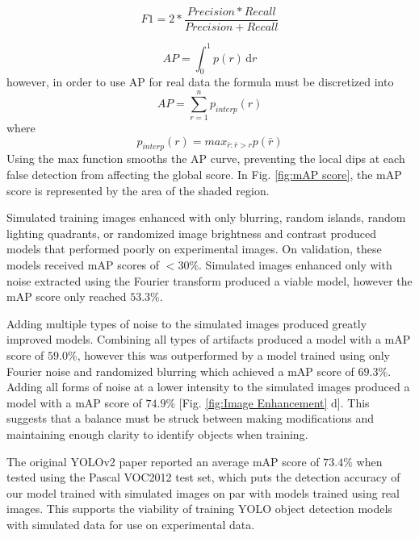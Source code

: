 \documentclass[twoside,twocolumn,9pt]{article}
\begin{document}
\begin{equation}
F1 = 2*\frac{Precision * Recall}{Precision + Recall}
\end{equation}


$$ AP = \int_0^1 \!p(r) \, \mathrm{d}r $$
however, in order to use AP for real data the formula must be discretized into
\begin{equation}
AP = \sum_{r=1}^{n} p_{interp}(r)
\end{equation}
where
$$ p_{interp}(r) = max_{\bar{r}:\bar{r}>r} p(\bar{r})  $$
Using the max function smooths the AP curve, preventing the local dips at each false detection from affecting the global score. In Fig. \ref{fig:mAP score}, the mAP score is represented by the area of the shaded region.

Simulated training images enhanced with only blurring, random islands, random lighting quadrants, or randomized image brightness and contrast produced models that performed poorly on experimental images. On validation, these models received mAP scores of $<30\%$. Simulated images enhanced only with noise extracted using the Fourier transform produced a viable model, however the mAP score only reached $53.3\%$.

Adding multiple types of noise to the simulated images produced greatly improved models. Combining all types of artifacts produced a model with a mAP score of $59.0\%$, however this was outperformed by a model trained using only Fourier noise and randomized blurring which achieved a mAP score of $69.3\%$. Adding all forms of noise at a lower intensity to the simulated images produced a model with a mAP score of $74.9\%$ [Fig. \ref{fig:Image Enhancement} d]. This suggests that a balance must be struck between making modifications and maintaining enough clarity to identify objects when training.

The original YOLOv2 \cite{redmon_yolo9000:_2016} paper reported an average mAP score of $73.4\%$ when tested using the Pascal VOC2012 test set, which puts the detection accuracy of our model trained with simulated images on par with models trained using real images. This supports the viability of training YOLO object detection models with simulated data for use on experimental data.
\end{document}
